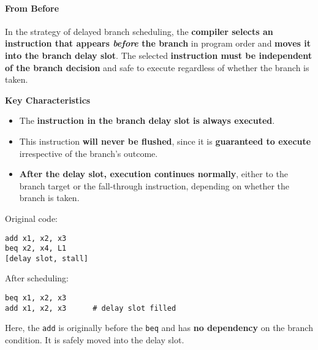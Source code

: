 \paragraph{From Before}\label{paragraph: From Before}

In the  strategy of delayed branch scheduling, the \textbf{compiler selects an instruction that appears \emph{before} the branch} in program order and \textbf{moves it into the branch delay slot}. The selected \textbf{instruction must be independent of the branch decision} and safe to execute regardless of whether the branch is taken.

\highspace
\begin{flushleft}
    \textcolor{Green3}{ \textbf{Key Characteristics}}
\end{flushleft}
\begin{itemize}
    \item The \textbf{instruction in the branch delay slot is always executed}.
    \item This instruction \textbf{will never be flushed}, since it is \textbf{guaranteed to execute} irrespective of the branch's outcome.
    \item \textbf{After the delay slot, execution continues normally}, either to the branch target or the fall-through instruction, depending on whether the branch is taken.
\end{itemize}

\begin{examplebox}
    Original code:
    \begin{lstlisting}[language=riscv]
add x1, x2, x3
beq x2, x4, L1
[delay slot, stall]\end{lstlisting}
    After scheduling:
    \begin{lstlisting}[language=riscv]
beq x1, x2, x3
add x1, x2, x3      # delay slot filled\end{lstlisting}
    Here, the \texttt{add} is originally before the \texttt{beq} and has \textbf{no dependency} on the branch condition. It is safely moved into the delay slot.
\end{examplebox}


